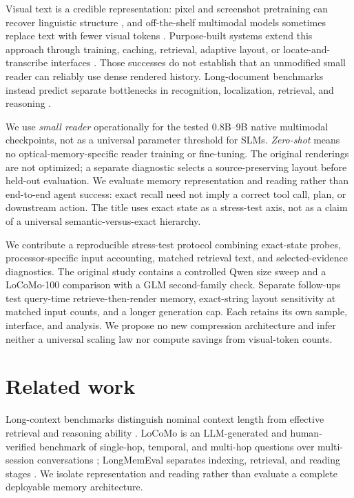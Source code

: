 \documentclass{article}
\begin{document}
Visual text is a credible representation: pixel and screenshot pretraining can recover linguistic structure \citep{rust2023pixel,lee2023pix2struct}, and off-the-shelf multimodal models sometimes replace text with fewer visual tokens \citep{li2025textpixels}. Purpose-built systems extend this approach through training, caching, retrieval, adaptive layout, or locate-and-transcribe interfaces \citep{cheng2026glyph,feng2026agentocr,li2026ocrmemory,liang2026vizomem,shi2026memocr}. Those successes do not establish that an unmodified small reader can reliably use dense rendered history. Long-document benchmarks instead predict separate bottlenecks in recognition, localization, retrieval, and reasoning \citep{ma2024mmlongbench,fu2025ocrbench,tu2026fico}.

We use \emph{small reader} operationally for the tested 0.8B--9B native multimodal checkpoints, not as a universal parameter threshold for SLMs. \emph{Zero-shot} means no optical-memory-specific reader training or fine-tuning. The original renderings are not optimized; a separate diagnostic selects a source-preserving layout before held-out evaluation. We evaluate memory representation and reading rather than end-to-end agent success: exact recall need not imply a correct tool call, plan, or downstream action. The title uses exact state as a stress-test axis, not as a claim of a universal semantic-versus-exact hierarchy.

We contribute a reproducible stress-test protocol combining exact-state probes, processor-specific input accounting, matched retrieval text, and selected-evidence diagnostics. The original study contains a controlled Qwen size sweep and a LoCoMo-100 comparison with a GLM second-family check. Separate follow-ups test query-time retrieve-then-render memory, exact-string layout sensitivity at matched input counts, and a longer generation cap. Each retains its own sample, interface, and analysis. We propose no new compression architecture and infer neither a universal scaling law nor compute savings from visual-token counts.

\section{Related work}

Long-context benchmarks distinguish nominal context length from effective retrieval and reasoning ability \citep{bai2024longbench,hsieh2024ruler}. LoCoMo is an LLM-generated and human-verified benchmark of single-hop, temporal, and multi-hop questions over multi-session conversations \citep{maharana2024locomo}; LongMemEval separates indexing, retrieval, and reading stages \citep{wu2025longmemeval}. We isolate representation and reading rather than evaluate a complete deployable memory architecture.
\end{document}
